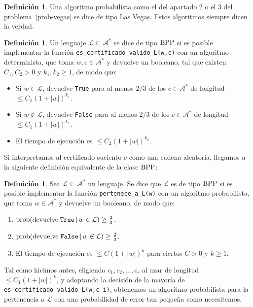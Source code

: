 \documentclass[a4paper, 11pt]{article}
\newcommand{\Alf}{\mathcal{A}}
\newcommand{\Lan}{\mathcal{L}}
\theoremstyle{plain}
\theoremstyle{definition}
\newtheorem{defi}[teor]{Definición}
\begin{document}
\begin{defi}
Una algoritmo probabilista como el del apartado 2 o el 3 del problema~\ref{prob-vegas}
se dice de tipo Las Vegas. Estos algoritmos siempre dicen la verdad.
\end{defi}

\begin{defi}\label{def-BPP}
Un lenguaje $\Lan\subseteq\Alf^*$ se dice de tipo ${\rm BPP}$ si es posible implementar
la función \texttt{es\_certificado\_valido\_L(w,c)} con un algoritmo determinista, que
toma $w,c\in\Alf^*$ y devuelve un booleano, tal que existen $C_1,C_2>0$ y $k_1,k_2\geq 1$, de modo que:
\begin{itemize}
\item Si $w\in\Lan$, devuelve \texttt{True} para al menos $2/3$ de los $c\in\Alf^*$
de longitud $\leq C_1(1+|w|)^{k_1}$.
\item Si $w\not\in\Lan$, devuelve \texttt{False} para al menos $2/3$ de los
$c\in\Alf^*$ de longitud $\leq C_1(1+|w|)^{k_1}$.
\item El tiempo de ejecución es $\leq C_2(1+|w|)^{k_2}$.
\end{itemize}
\end{defi}

\bigskip

Si interpretamos al certificado suciento $c$ como una cadena aleatoria, llegamos a
la siguiente definición equivalente de la clase ${\rm BPP}$:

\begin{defi}\label{def-BPP2}
Sea $\Lan\subseteq\Alf^*$ un lenguaje. Se dice que $\Lan$ es de tipo ${\rm BPP}$
si es posible implementar la función \texttt{pertenece\_a\_L(w)} con un algoritmo
probabilista, que toma $w\in\Alf^*$ y devuelve un booleano, de modo que:
\begin{enumerate}
\item ${\rm prob}({\rm devuelve}\;\texttt{True}\,|\,w\in\Lan)\geq\frac23$.
\item ${\rm prob}({\rm devuelve}\;\texttt{False}\,|\,w\not\in\Lan)\geq\frac23$.
\item El tiempo de ejecución es $\leq C(1+|w|)^k$ para ciertos $C>0$ y $k\geq 1$.
\end{enumerate}
\end{defi}

\bigskip

Tal como hicimos antes, eligiendo $c_1,c_2,\ldots,c_r$ al azar de longitud
$\leq C_1(1+|w|)^k$, y adoptando la decisión de la mayoría de 
\texttt{es\_certificado\_valido\_L(w,c\_i)}, obtenemos un algoritmo probabilista
para la pertenencia a $\Lan$ con una probabilidad de error tan pequeña como
necesitemos.
\end{document}

